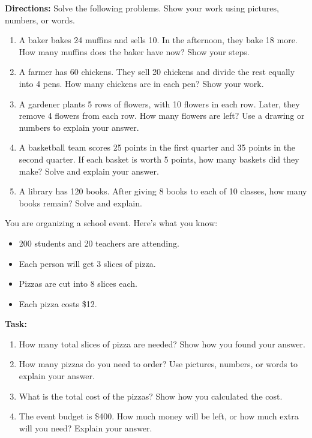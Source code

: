 \documentclass[12pt]{article}
\begin{document}
\begin{tcolorbox}[colframe=black!60, colback=white, 
coltitle=black, colbacktitle=black!15, fonttitle=\bfseries\Large, 
title=Problems, halign title=center, left=10pt, right=10pt, top=10pt, bottom=60pt]
\textbf{Directions:} Solve the following problems. Show your work using pictures, numbers, or words.

\begin{enumerate}[start=6, itemsep=6em]
    \item A baker bakes 24 muffins and sells 10. In the afternoon, they bake 18 more. How many muffins does the baker have now? Show your steps.
    \item A farmer has 60 chickens. They sell 20 chickens and divide the rest equally into 4 pens. How many chickens are in each pen? Show your work.
    \item A gardener plants 5 rows of flowers, with 10 flowers in each row. Later, they remove 4 flowers from each row. How many flowers are left? Use a drawing or numbers to explain your answer.
    \item A basketball team scores 25 points in the first quarter and 35 points in the second quarter. If each basket is worth 5 points, how many baskets did they make? Solve and explain your answer.
    \item A library has 120 books. After giving 8 books to each of 10 classes, how many books remain? Solve and explain.
\end{enumerate}
\vspace{2.5em}
\end{tcolorbox}


\vspace{1em}

\begin{tcolorbox}[colframe=black!60, colback=white, 
coltitle=black, colbacktitle=black!15, fonttitle=\bfseries\Large, 
title=Performance Task: Planning a School Event, halign title=center, left=10pt, right=10pt, top=10pt, bottom=50pt]
You are organizing a school event. Here’s what you know:
\begin{itemize}
    \item 200 students and 20 teachers are attending.
    \item Each person will get 3 slices of pizza.
    \item Pizzas are cut into 8 slices each.
    \item Each pizza costs \$12.
\end{itemize}
\textbf{Task:}
\begin{enumerate}[itemsep=4.5em]
    \item How many total slices of pizza are needed? Show how you found your answer.
    \item How many pizzas do you need to order? Use pictures, numbers, or words to explain your answer.
    \item What is the total cost of the pizzas? Show how you calculated the cost.
    \item The event budget is \$400. How much money will be left, or how much extra will you need? Explain your answer.
\end{enumerate}
\end{tcolorbox}
\end{document}
